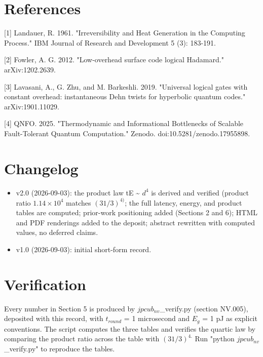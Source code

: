 \documentclass[11pt]{article}
\begin{document}
\section*{References}
[1] Landauer, R. 1961. "Irreversibility and Heat Generation in the Computing Process." IBM Journal of Research and Development 5 (3): 183-191.

[2] Fowler, A. G. 2012. "Low-overhead surface code logical Hadamard." arXiv:1202.2639.

[3] Lavasani, A., G. Zhu, and M. Barkeshli. 2019. "Universal logical gates with constant overhead: instantaneous Dehn twists for hyperbolic quantum codes." arXiv:1901.11029.

[4] QNFO. 2025. "Thermodynamic and Informational Bottlenecks of Scalable Fault-Tolerant Quantum Computation." Zenodo. doi:10.5281/zenodo.17955898.

\section*{Changelog}
\begin{itemize}
  \item v2.0 (2026-09-03): the product law tE \textasciitilde{} $d^{4}$ is derived and verified (product ratio $1.14\times 10^{4}$ matches $(31/3)^{4)}$; the full latency, energy, and product tables are computed; prior-work positioning added (Sections 2 and 6); HTML and PDF renderings added to the deposit; abstract rewritten with computed values, no deferred claims.
  \item v1.0 (2026-09-03): initial short-form record.
\end{itemize}
\section*{Verification}
Every number in Section 5 is produced by $jpcub_{nv}$\_verify.py (section NV.005), deposited with this record, with $t_{round}$ = 1 microsecond and $E_{g}$ = 1 pJ as explicit conventions. The script computes the three tables and verifies the quartic law by comparing the product ratio across the table with $(31/3)^{4.}$ Run "python $jpcub_{nv}$\_verify.py" to reproduce the tables.
\end{document}
